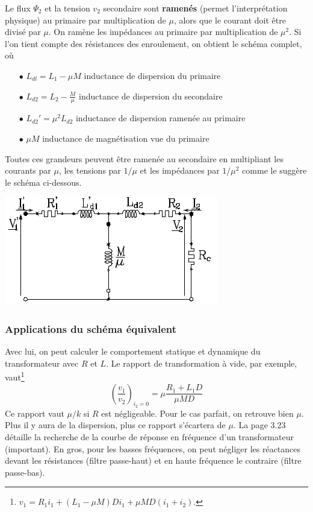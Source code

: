 		Le flux $\Psi_2$ et la tension $v_2$ secondaire sont \textbf{ramenés} (permet 
		l'interprétation physique) au primaire 
		par multiplication de $\mu$, alors que le courant doit être divisé par $
		\mu$. On ramène les impédances au primaire par multiplication de $\mu^2$.
		Si l'on tient compte des résistances des enroulement, on obtient le schéma 
		complet, où
		\begin{itemize}
		\item[$\bullet$] $L_{dl} = L_1-\mu M$ inductance de dispersion du primaire
		\item[$\bullet$] $L_{d2} = L_2-\frac{M}{\mu}$ inductance de dispersion du 
		secondaire
		\item[$\bullet$] $L_{d2}' = \mu^2L_{d2}$ inductance de dispersion ramenée au 
		primaire
		\item[$\bullet$] $\mu M$ inductance de magnétisation vue du primaire
		\end{itemize}
		Toutes ces grandeurs peuvent être ramenée au secondaire en multipliant les
		courants par $\mu$, les tensions par $1/\mu$ et les impédances par $1/\mu^2$ 
		comme le suggère le schéma ci-dessous.
		\begin{center}
		\includegraphics[scale=0.57]{ch3/image11.png}
		\end{center}
		
		
		\subsubsection{Applications du schéma équivalent}
		Avec lui, on peut calculer le comportement statique et dynamique du 
		transformateur avec $R$ et $L$. Le rapport de transformation à vide, par 
		exemple, vaut\footnote{$v_1 = R_1i_1 + (L_1-\mu M)Di_1 + \mu MD(i_1+i_2)$.}
		\begin{equation}
		\left(\dfrac{v_1}{v_2}\right)_{i_2=0} = \mu\dfrac{R_1+L_1D}{\mu MD}
		\end{equation}
		Ce rapport vaut $\mu/k$ si $R$ est 
		négligeable. Pour le cas parfait, on retrouve bien $\mu$. Plus il y 
		aura de la dispersion, plus ce rapport s'écartera de $\mu$.
		La page 3.23 détaille la recherche de la courbe de réponse en fréquence 
		d'un transformateur (important). En gros, pour les basses fréquences, on peut
		négliger les réactances devant les résistances (filtre passe-haut) et en haute 
		fréquence le
		contraire (filtre passe-bas). 
		
